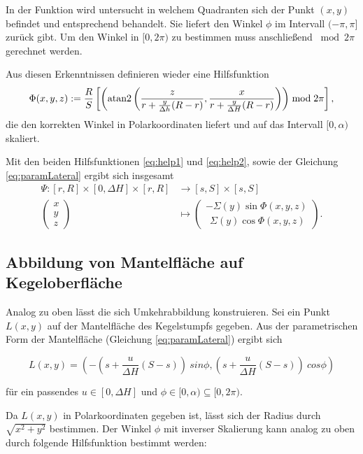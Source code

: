 In der Funktion wird untersucht in welchem Quadranten sich der Punkt $(x,y)$ befindet und entsprechend behandelt. Sie liefert den Winkel $\phi$ im Intervall $(-\pi, \pi]$ zurück gibt.
Um den Winkel in $[0,2\pi)$ zu bestimmen muss anschließend $\bmod 2\pi$ gerechnet werden. 

Aus diesen Erkenntnissen definieren wieder eine Hilfsfunktion
\begin{equation} \label{eq:help2}
\Phi(x,y,z) := \frac{R}{S} \left[\left(\text{atan2}\left(\frac{z}{r + \frac{y}{\Delta h} (R - r)}, \frac{x}{r + \frac{y}{\Delta H} (R - r)}\right)\right) \bmod 2\pi \right],
\end{equation}
die den korrekten Winkel in Polarkoordinaten liefert und auf das Intervall $[0, \alpha)$ skaliert.

Mit den beiden Hilfsfunktionen \ref{eq:help1} und \ref{eq:help2}, sowie der Gleichung \ref{eq:paramLateral} ergibt sich insgesamt
\begin{equation}\label{eq:coneToLateral}
\begin{aligned}
\Psi \colon [r,R] \times [0, \Delta H] \times [r,R] &\to [s,S] \times [s,S]\\
\begin{pmatrix}
x \\ y \\ z
\end{pmatrix}  &\mapsto
\begin{pmatrix}
-\Sigma(y)\sin \Phi(x,y,z)\\
 ~~\Sigma(y)\cos\Phi(x,y,z)
\end{pmatrix}.
\end{aligned}
\end{equation}

\subsection{Abbildung von Mantelfläche auf Kegeloberfläche}

Analog zu oben lässt die sich Umkehrabbildung konstruieren.
Sei ein Punkt $L(x,y)$ auf der Mantelfläche des Kegelstumpfs gegeben. Aus der parametrischen Form der Mantelfläche (Gleichung \ref{eq:paramLateral}) ergibt sich

\[
L(x,y) = (-(s + \frac{u}{\Delta H}(S-s)) ~sin \phi, (s + \frac{u}{\Delta H} (S-s)) ~cos \phi)
\]

für ein passendes $u\in [0, \Delta H]$ und $\phi \in [0, \alpha) \subseteq  [0, 2\pi)$.

Da $L(x,y)$ in Polarkoordinaten gegeben ist, lässt sich der Radius durch $\sqrt{x^2+y^2}$ bestimmen. Der Winkel $\phi$ mit inverser Skalierung kann analog zu oben durch folgende Hilfsfunktion bestimmt werden:

